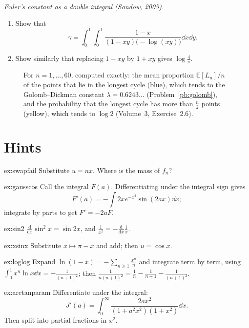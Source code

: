 \begin{exercise}[$\star\star$]\label{pb:sondow}
\emph{Euler's constant as a double integral (Sondow, 2005).}
\begin{enumerate}[label=(\alph*)]
\item Show that
\[
\gamma=\int_0^1\!\!\int_0^1\frac{1-x}{(1-xy)\bigl(-\log(xy)\bigr)}\dd x\dd y.
\]
\item Show similarly that replacing $1-xy$ by $1+xy$ gives $\log\frac4\pi$.
\end{enumerate}
\end{exercise}

\begin{figure}[ht]
\centering
{}
\caption{For $n=1,\dots,60$, computed exactly: the mean proportion $\mathbb E[L_n]/n$ of the points that lie in the longest
cycle (blue), which tends to the Golomb--Dickman constant $\lambda=0.6243\ldots$ (Problem~\ref{pb:golomb}), and the
probability that the longest cycle has more than $\frac n2$ points (yellow), which tends to $\log2$ (Volume~3, Exercise~2.6).}
\label{fig:longest}
\end{figure}

\section{Hints}

\begin{hint}{ex:swapfail}
Substitute $u=nx$. Where is the mass of $f_n$?
\end{hint}
\begin{hint}{ex:gausscos}
Call the integral $F(a)$. Differentiating under the integral sign gives
\[
F'(a)=-\int2xe^{-x^2}\sin(2ax)\dd x;
\]
integrate by parts to get $F'=-2aF$.
\end{hint}
\begin{hint}{ex:sin2}
$\frac{\mathrm d}{\mathrm dx}\sin^2x=\sin2x$, and $\frac1{x^2}=-\frac{\mathrm d}{\mathrm dx}\frac1x$.
\end{hint}
\begin{hint}{ex:xsinx}
Substitute $x\mapsto\pi-x$ and add; then $u=\cos x$.
\end{hint}
\begin{hint}{ex:loglog}
Expand $\ln(1-x)=-\sum_{n\ge1}\frac{x^n}n$ and integrate term by term, using $\int_0^1x^n\ln x\dd x=-\frac1{(n+1)^2}$; then
$\frac1{n(n+1)^2}=\frac1n-\frac1{n+1}-\frac1{(n+1)^2}$.
\end{hint}
\begin{hint}{ex:arctanparam}
Differentiate under the integral:
\[
J'(a)=\int_0^\infty\frac{2ax^2}{(1+a^2x^2)(1+x^2)}\dd x.
\]
Then split into partial fractions in $x^2$.
\end{hint}

